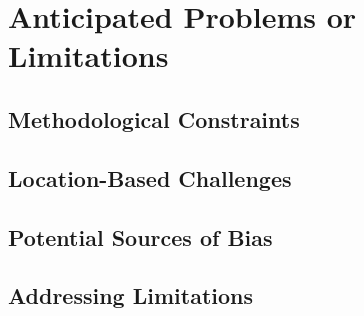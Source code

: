 \section{Anticipated Problems or Limitations}

\subsection*{Methodological Constraints}

\subsection*{Location-Based Challenges}

\subsection*{Potential Sources of Bias}

\subsection*{Addressing Limitations}
